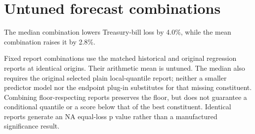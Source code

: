 \section{Untuned forecast combinations}\label{sup:wp3}

The median combination lowers Treasury-bill loss by 4.0\%, while the mean combination raises it by 2.8\%.

Fixed report combinations use the matched historical and original
regression reports at identical origins. Their arithmetic mean is untuned.
The median also requires the original selected plain local-quantile report;
neither a smaller predictor model nor the endpoint plug-in substitutes for
that missing constituent. Combining floor-respecting reports preserves the floor, but does not guarantee a conditional quantile or a score below that of the best constituent. Identical reports generate an NA equal-loss p value rather
than a manufactured significance result.
\begingroup
\small
\setlength{\tabcolsep}{3pt}
\renewcommand{\arraystretch}{1.12}
